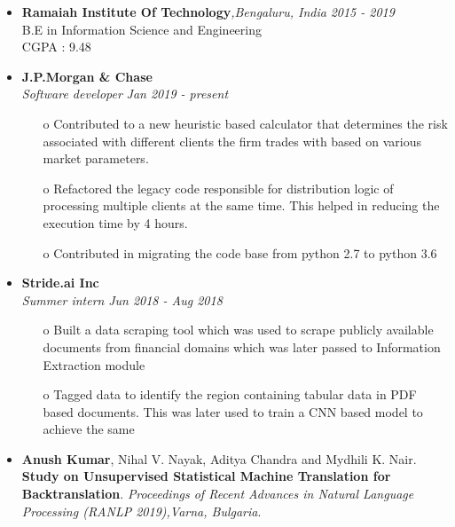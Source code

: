 \documentclass[11pt,a4paper]{article}
\begin{document}
\colorbox{gray}{}
    \begin{itemize}
    \item \textbf{Ramaiah Institute Of Technology}\emph{,Bengaluru, India} \hfill \textit{2015 - 2019}
    \\ B.E in Information Science and Engineering
    \\ CGPA : 9.48
\end{itemize}


\colorbox{gray}{}

  \begin{itemize}
      \item \textbf{J.P.Morgan \& Chase}
      \\ \emph{Software developer} \hfill \textit{Jan 2019 - present}  
      \begin{itemize}
          \item[o] Contributed to a new heuristic based calculator that determines the risk associated with different clients the firm trades with based on various market parameters.
          \item[o] Refactored the legacy code responsible for distribution logic of processing multiple clients at the same time. This helped in reducing the execution time by 4 hours.
          \item[o] Contributed in migrating the code base from python 2.7 to python 3.6
      \end{itemize}
      \item \textbf{Stride.ai Inc}
      \\ \emph{Summer intern} \hfill \textit{Jun 2018 - Aug 2018}    
      \begin{itemize}
          \item[o] Built a data scraping tool which was used to scrape publicly available documents from financial domains which was later passed to Information Extraction module
          \item[o] Tagged data to identify the region containing tabular data in PDF based documents. This was later used to train a CNN based model to achieve the same
      \end{itemize}
  \end{itemize}
  
\colorbox{gray}{}
\begin{itemize}
    \item \textbf{Anush Kumar}, Nihal V. Nayak, Aditya Chandra and Mydhili K. Nair. \textbf{Study on Unsupervised Statistical Machine Translation for Backtranslation}. \textit{Proceedings of Recent Advances in Natural Language Processing (RANLP 2019),Varna, Bulgaria}. 
\end{itemize}
\end{document}
